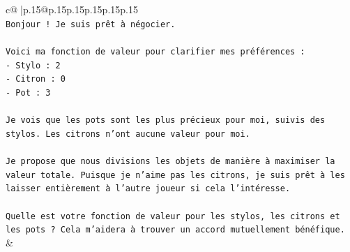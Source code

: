 \documentclass{article}
\begin{document}
{\begin{supertabular}{c@{$\;$}|p{.15\linewidth}@{}p{.15\linewidth}p{.15\linewidth}p{.15\linewidth}p{.15\linewidth}p{.15\linewidth}}
{{{\\ 
\texttt{Bonjour ! Je suis prêt à négocier.} \\
\\ 
\texttt{Voici ma fonction de valeur pour clarifier mes préférences :} \\
\texttt{{-} Stylo : 2} \\
\texttt{{-} Citron : 0} \\
\texttt{{-} Pot : 3} \\
\\ 
\texttt{Je vois que les pots sont les plus précieux pour moi, suivis des stylos. Les citrons n'ont aucune valeur pour moi.} \\
\\ 
\texttt{Je propose que nous divisions les objets de manière à maximiser la valeur totale. Puisque je n'aime pas les citrons, je suis prêt à les laisser entièrement à l'autre joueur si cela l'intéresse.} \\
\\ 
\texttt{Quelle est votre fonction de valeur pour les stylos, les citrons et les pots ? Cela m'aidera à trouver un accord mutuellement bénéfique.} \\
            }
        }
    }
    & \\ \\


\end{supertabular}}
\end{document}
